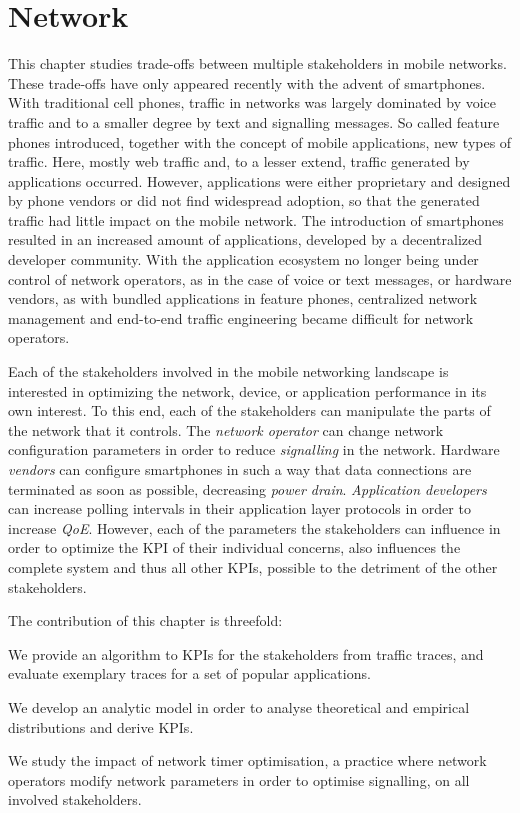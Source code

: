 \chapter{Network}\label{chap:network}
This chapter studies trade-offs between multiple stakeholders in mobile networks.
These trade-offs have only appeared recently with the advent of smartphones.
With traditional cell phones, traffic in networks was largely dominated by voice traffic and to a smaller degree by text and signalling messages.
So called feature phones introduced, together with the concept of mobile applications, new types of traffic.
Here, mostly web traffic and, to a lesser extend, traffic generated by applications occurred.
However, applications were either proprietary and designed by phone vendors or did not find widespread adoption, so that the generated traffic had little impact on the mobile network.
The introduction of smartphones resulted in an increased amount of applications, developed by a decentralized developer community.
With the application ecosystem no longer being under control of network operators, as in the case of voice or text messages, or hardware vendors, as with bundled applications in feature phones, centralized network management and end-to-end traffic engineering became difficult for network operators.

Each of the stakeholders involved in the mobile networking landscape is interested in optimizing the network, device, or application performance in its own interest.
To this end, each of the stakeholders can manipulate the parts of the network that it controls.
The \emph{network operator} can change network configuration parameters in order to reduce \emph{signalling} in the network.
Hardware \emph{vendors} can configure smartphones in such a way that data connections are terminated as soon as possible, decreasing \emph{power drain}.
\emph{Application developers} can increase polling intervals in their application layer protocols in order to increase \emph{\gls{QoE}}.	
However, each of the parameters the stakeholders can influence in order to optimize the \gls{KPI} of their individual concerns, also influences the complete system and thus all other \glspl{KPI}, possible to the detriment of the other stakeholders.

The contribution of this chapter is threefold:
\begin{enumerate*}
\item We provide an algorithm to \glspl{KPI} for the stakeholders from traffic traces, and evaluate exemplary traces for a set of popular applications.
\item We develop an analytic model in order to analyse theoretical and empirical distributions and derive \glspl{KPI}.
\item We study the impact of network timer optimisation, a practice where network operators modify network parameters in order to optimise signalling, on all involved stakeholders.
\end{enumerate*}

